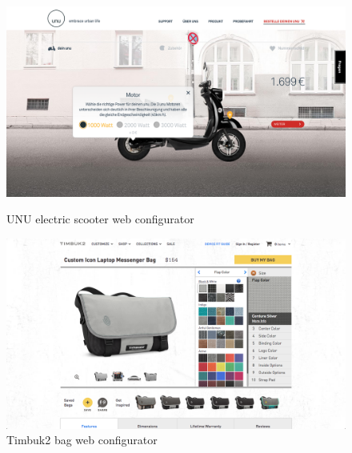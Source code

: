 \documentclass[../medieninformatik-arbeit.tex]{subfiles}
\begin{document}
\begin{figure}[h]
\captionsetup{width=0.4\textwidth}
\centering
\begin{minipage}{.45\textwidth}
\centering
  \includegraphics[width=\linewidth]{RelatedWork/img/unu-config}
  \caption{\protect UNU electric scooter web configurator\cite{unu:2015:Online}}
\label{fig:unu-config}
\end{minipage}
\begin{minipage}{.45\textwidth}
\centering
  \includegraphics[width=\linewidth]{RelatedWork/img/timbuk2-config}
  \caption{\protect Timbuk2 bag web configurator\cite{timbuk2:2015:Online}}
\label{fig:timbuk2-config}
\end{minipage}
\end{figure}
\end{document}
